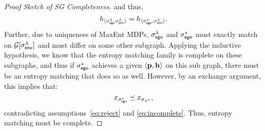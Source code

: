 \begin{proof}[Proof Sketch of SG Completeness]
  and thus,
  \begin{equation}
    h_{\langle \sigma_{\mathsf{ego}}^\lambda \sigma_{\mathsf{env}}^\lambda \rangle} =  h_{\langle \sigma_{\mathsf{ego}}^*, \sigma_{\mathsf{env}}^\lambda \rangle}.
  \end{equation}
  Further, due to uniqueness of MaxEnt MDPs, $\sigma_{\mathsf{ego}}^\lambda$ and
  $\sigma_{\mathsf{ego}}^*$ must exactly match on $\mathcal{G}[\sigma_{\mathsf{env}}^\lambda]$ and
  must differ on some other subgraph.  Applying the inductive
  hypothesis, we know that the entropy matching family is complete on
  these subgraphs, and thus if $\sigma_{\mathsf{ego}}^*$ achieves a given
  $\langle\mathbf{p}, \mathbf{h}\rangle$ on this sub graph, there
  must be an entropy matching that does so as well.  However, by an
  exchange argument, this implies that:
  \begin{equation}
    x_{\sigma_{\mathsf{ego}}^*} \preceq x_{\sigma_{\lambda^*}},
  \end{equation}
  contradicting
  assumptions~\eqref{eq:reject} and \eqref{eq:incomplete}.  Thus,
  entropy matching must be complete.
\end{proof}

